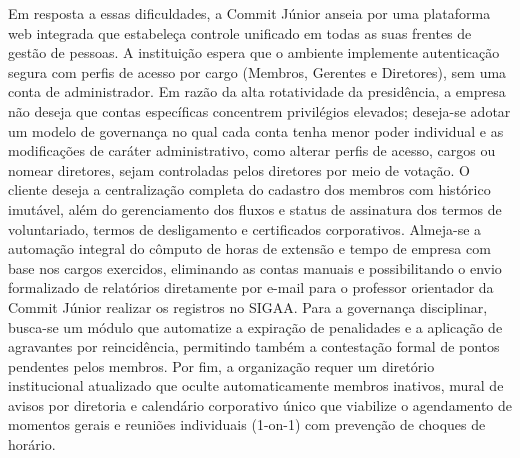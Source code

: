Em resposta a essas dificuldades, a Commit Júnior anseia por uma plataforma web integrada que estabeleça controle unificado em todas as suas frentes de gestão de pessoas. A instituição espera que o ambiente implemente autenticação segura com perfis de acesso por cargo (Membros, Gerentes e Diretores), sem uma conta de administrador. Em razão da alta rotatividade da presidência, a empresa não deseja que contas específicas concentrem privilégios elevados; deseja-se adotar um modelo de governança no qual cada conta tenha menor poder individual e as modificações de caráter administrativo, como alterar perfis de acesso, cargos ou nomear diretores, sejam controladas pelos diretores por meio de votação. O cliente deseja a centralização completa do cadastro dos membros com histórico imutável, além do gerenciamento dos fluxos e status de assinatura dos termos de voluntariado, termos de desligamento e certificados corporativos. Almeja-se a automação integral do cômputo de horas de extensão e tempo de empresa com base nos cargos exercidos, eliminando as contas manuais e possibilitando o envio formalizado de relatórios diretamente por e-mail para o professor orientador da Commit Júnior realizar os registros no SIGAA. Para a governança disciplinar, busca-se um módulo que automatize a expiração de penalidades e a aplicação de agravantes por reincidência, permitindo também a contestação formal de pontos pendentes pelos membros. Por fim, a organização requer um diretório institucional atualizado que oculte automaticamente membros inativos, mural de avisos por diretoria e calendário corporativo único que viabilize o agendamento de momentos gerais e reuniões individuais (1-on-1) com prevenção de choques de horário.

\clearpage
